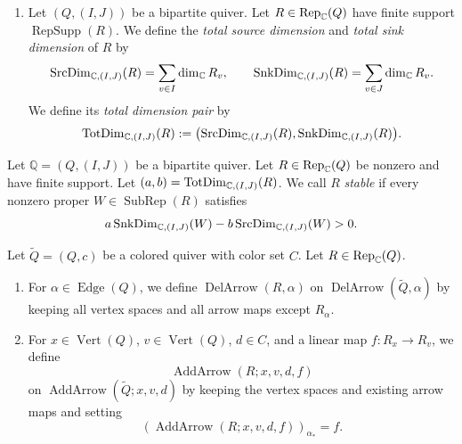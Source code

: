 \begin{definition}
\begin{enumerate}[font=\itshape]
A \textit{colored subrepresentation} $W$ of $R$ is a representation of $\widetilde Q$
such that $W\in\operatorname{SubRep}(R)$.
We denote the set of these colored subrepresentations by $\operatorname{SubColRep}(R)$.
\item\label{d:total-dimensions} Let $(Q,(I,J))$ be a bipartite quiver. Let $R\in\operatorname{Rep}_{\mathbb C}(Q)$ have finite support $\operatorname{RepSupp}(R)$.
We define the \textit{total source dimension} and \textit{total sink dimension} of $R$ by
\[
 \operatorname{SrcDim}_{\mathbb C,(I,J)}(R)=\sum_{v\in I}\dim_{\mathbb C}R_v,\qquad
 \operatorname{SnkDim}_{\mathbb C,(I,J)}(R)=\sum_{v\in J}\dim_{\mathbb C}R_v.
\]
We define its \textit{total dimension pair} by
\[
 \operatorname{TotDim}_{\mathbb C,(I,J)}(R):=\bigl(\operatorname{SrcDim}_{\mathbb C,(I,J)}(R),\operatorname{SnkDim}_{\mathbb C,(I,J)}(R)\bigr).
\]
\end{enumerate}
\end{definition}

\begin{definition}\label{def:bipartite-stability}
Let $\mathbb Q=(Q,(I,J))$ be a bipartite quiver.
Let $R\in\operatorname{Rep}_{\mathbb C}(Q)$ be nonzero and have finite support.
Let $(a,b)=\operatorname{TotDim}_{\mathbb C,(I,J)}(R)$.
We call $R$ \textit{stable} if every nonzero proper $W\in\operatorname{SubRep}(R)$ satisfies
\[
 a\operatorname{SnkDim}_{\mathbb C,(I,J)}(W)-b\operatorname{SrcDim}_{\mathbb C,(I,J)}(W)>0.
\]
\end{definition}

\begin{definition}\label{def:representation-arrow-operators}
Let $\widetilde Q=(Q,c)$ be a colored quiver with color set $C$. Let $R\in\operatorname{Rep}_{\mathbb C}(Q)$.
\begin{enumerate}[font=\itshape]
\item\label{d:representation-delete-arrow} For $\alpha\in\operatorname{Edge}(Q)$, we define
$\operatorname{DelArrow}(R,\alpha)$ on $\operatorname{DelArrow}(\widetilde Q,\alpha)$
by keeping all vertex spaces and all arrow maps except $R_\alpha$.
\item\label{d:representation-add-arrow} For $x\in\operatorname{Vert}(Q)$, $v\in\operatorname{Vert}(Q)$, $d\in C$, and a linear map $f:R_x\to R_v$,
we define
\[
 \operatorname{AddArrow}(R;x,v,d,f)
\]
on $\operatorname{AddArrow}(\widetilde Q;x,v,d)$ by keeping the vertex spaces and
existing arrow maps and setting
\[
 (\operatorname{AddArrow}(R;x,v,d,f))_{\alpha_*}=f.
\]
\end{enumerate}
\end{definition}




